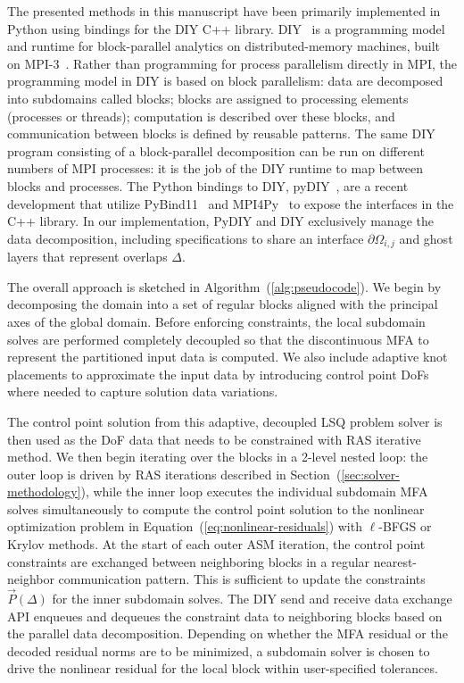 \documentclass[conference]{IEEEtran}
\newcommand{\Remark}[1]{{\color{RED}\sf Remark: {#1}}}
\newcommand{\eqt}[1]{Equation~(\ref{#1})}
\newcommand{\sect}[1]{Section~(\ref{#1})}
\newcommand{\algo}[1]{Algorithm~(\ref{#1})}
\begin{document}
The presented methods in this manuscript have been primarily implemented in Python using bindings for the DIY C++ library. DIY~\cite{morozov16} is a programming model and runtime
for block-parallel analytics on distributed-memory machines, built on MPI-3~\cite{dongarra13}.  Rather than programming
for process parallelism directly in MPI, the programming model in DIY is based on block parallelism: data are decomposed
into subdomains called blocks; blocks are assigned to processing elements (processes or threads); computation is
described over these blocks, and communication between blocks is defined by reusable patterns. The same DIY program
consisting of a block-parallel decomposition can be run on different numbers of MPI processes: it is the job of the DIY
runtime to map between blocks and processes. The Python bindings to DIY, pyDIY~\cite{pydiy},
are a recent development that utilize PyBind11~\cite{jakob17} and MPI4Py~\cite{dalcin11} to expose the interfaces in the C++ library. In our implementation, PyDIY and DIY exclusively manage the data decomposition, including specifications to share an interface $\partial \Omega_{i,j}$ and ghost layers that represent overlaps $\Delta$.

The overall approach is sketched in \algo{alg:pseudocode}.
We begin by decomposing the domain into a set of regular blocks aligned with the principal axes
of the global domain. Before enforcing constraints, the local subdomain solves are performed completely decoupled so that the discontinuous MFA to represent the partitioned input data is computed. We also include adaptive knot placements to approximate the input data by introducing control point DoFs where needed to capture solution data variations. 

The control point solution from this adaptive, decoupled LSQ problem solver is then used as the DoF data that needs to be constrained with RAS iterative method.
We then begin iterating over the blocks in a 2-level nested loop: the outer loop is driven by RAS
iterations described in \sect{sec:solver-methodology}, while the inner loop executes the individual subdomain MFA solves simultaneously to compute the control point solution to the nonlinear optimization problem in \eqt{eq:nonlinear-residuals}
with $\ell$-BFGS or Krylov methods. 
At the start of each outer ASM iteration, the control point constraints are exchanged between neighboring blocks in a regular nearest-neighbor communication pattern. This is sufficient to update the constraints $\vec{P}(\Delta)$ for the inner subdomain solves. The DIY send and receive data exchange API enqueues and dequeues the constraint data to neighboring blocks based on the parallel data decomposition.
Depending on whether the MFA residual or the decoded residual norms are to be minimized, a subdomain solver is chosen to drive the nonlinear residual for the local block within user-specified tolerances.
\end{document}
